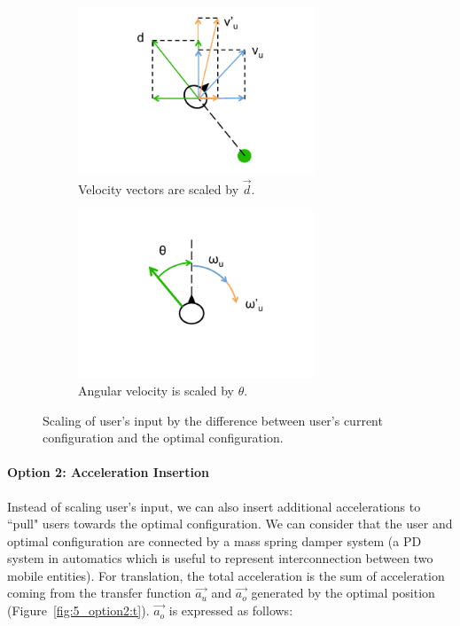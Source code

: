 \begin{figure}[htb]
  \begin{subfigure}{.5\textwidth}
    \centering
    \includegraphics[height=5cm]{figures/ch5/option1_t}
    \caption{Velocity vectors are scaled by $\overrightarrow{d}$.}
    \label{fig:5_option1:t}
  \end{subfigure}
  \begin{subfigure}{.5\textwidth}
    \centering
    \includegraphics[height=5cm]{figures/ch5/option1_r}
    \caption{Angular velocity is scaled by $\theta$.}
    \label{fig:5_option1:r}
  \end{subfigure}
  \caption{\label{fig:5_option1}Scaling of user's input by the difference between user's current configuration and the optimal configuration.}
\end{figure}

\paragraph{Option 2: Acceleration Insertion}
Instead of scaling user's input, we can also insert additional accelerations to ``pull" users towards the optimal configuration. We can consider that the user and optimal configuration are connected by a mass spring damper system (a PD system in automatics which is useful to represent interconnection between two mobile entities). For translation, the total acceleration is the sum of acceleration coming from the transfer function $\overrightarrow{a_{u}}$ and $\overrightarrow{a_{o}}$ generated by the optimal position (Figure~\ref{fig:5_option2:t}). $\overrightarrow{a_{o}}$ is expressed as follows:

